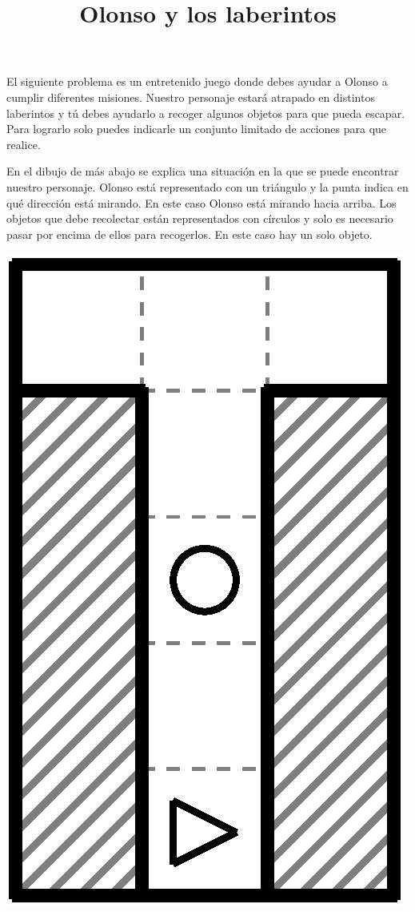 \documentclass{oci}
\title{Olonso y los laberintos}
\begin{document}
\begin{problemDescription}
  El siguiente problema es un entretenido juego donde debes ayudar a Olonso a cumplir diferentes misiones.
  Nuestro personaje estará atrapado en distintos laberintos y tú debes ayudarlo a recoger algunos objetos para que pueda escapar.
  Para lograrlo solo puedes indicarle un conjunto limitado de acciones para que realice.
  
En el dibujo de más abajo se explica una situación en la que se puede encontrar nuestro personaje.
  Olonso está representado con un triángulo y la punta indica en qué dirección está mirando.
En este caso Olonso está mirando hacia arriba.
Los objetos que debe recolectar están representados con círculos y solo es necesario pasar por encima de ellos para recogerlos.
En este caso hay un solo objeto.

\begin{center}
\includegraphics[angle=90,scale=0.5]{laberintos/ejemplo1-1.eps}
\end{center}


\end{problemDescription}
\end{document}
